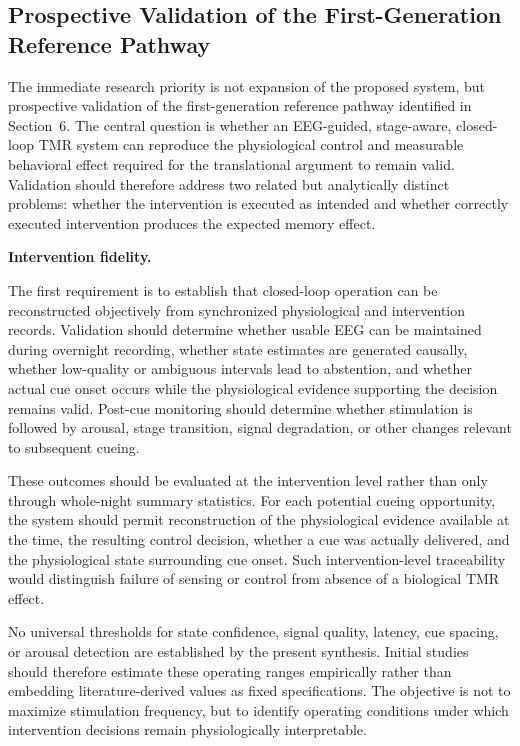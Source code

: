 \subsection{Prospective Validation of the First-Generation Reference Pathway}

The immediate research priority is not expansion of the proposed system, but
prospective validation of the first-generation reference pathway identified in
Section~6. The central question is whether an EEG-guided, stage-aware,
closed-loop TMR system can reproduce the physiological control and measurable
behavioral effect required for the translational argument to remain valid.
Validation should therefore address two related but analytically distinct
problems: whether the intervention is executed as intended and whether correctly
executed intervention produces the expected memory effect.

\noindent\textbf{Intervention fidelity.}

The first requirement is to establish that closed-loop operation can be
reconstructed objectively from synchronized physiological and intervention
records. Validation should determine whether usable EEG can be maintained
during overnight recording, whether state estimates are generated causally,
whether low-quality or ambiguous intervals lead to abstention, and whether
actual cue onset occurs while the physiological evidence supporting the
decision remains valid. Post-cue monitoring should determine whether
stimulation is followed by arousal, stage transition, signal degradation, or
other changes relevant to subsequent cueing.

These outcomes should be evaluated at the intervention level rather than only
through whole-night summary statistics. For each potential cueing opportunity,
the system should permit reconstruction of the physiological evidence available
at the time, the resulting control decision, whether a cue was actually
delivered, and the physiological state surrounding cue onset. Such
intervention-level traceability would distinguish failure of sensing or control
from absence of a biological TMR effect.

No universal thresholds for state confidence, signal quality, latency, cue
spacing, or arousal detection are established by the present synthesis.
Initial studies should therefore estimate these operating ranges empirically
rather than embedding literature-derived values as fixed specifications. The
objective is not to maximize stimulation frequency, but to identify operating
conditions under which intervention decisions remain physiologically
interpretable.

